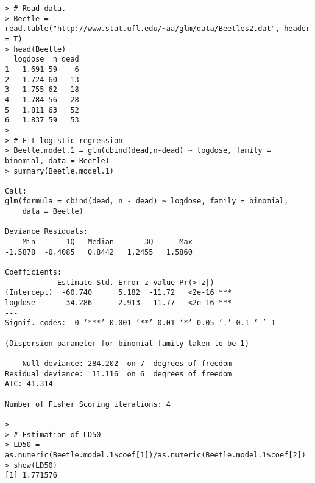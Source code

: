 \documentclass[a4paper]{article}
\begin{document}
\begin{lstlisting}
> # Read data.
> Beetle = read.table("http://www.stat.ufl.edu/~aa/glm/data/Beetles2.dat", header = T)
> head(Beetle)
  logdose  n dead
1   1.691 59    6
2   1.724 60   13
3   1.755 62   18
4   1.784 56   28
5   1.811 63   52
6   1.837 59   53
> 
> # Fit logistic regression
> Beetle.model.1 = glm(cbind(dead,n-dead) ~ logdose, family = binomial, data = Beetle)
> summary(Beetle.model.1)

Call:
glm(formula = cbind(dead, n - dead) ~ logdose, family = binomial, 
    data = Beetle)

Deviance Residuals: 
    Min       1Q   Median       3Q      Max  
-1.5878  -0.4085   0.8442   1.2455   1.5860  

Coefficients:
            Estimate Std. Error z value Pr(>|z|)    
(Intercept)  -60.740      5.182  -11.72   <2e-16 ***
logdose       34.286      2.913   11.77   <2e-16 ***
---
Signif. codes:  0 ‘***’ 0.001 ‘**’ 0.01 ‘*’ 0.05 ‘.’ 0.1 ‘ ’ 1

(Dispersion parameter for binomial family taken to be 1)

    Null deviance: 284.202  on 7  degrees of freedom
Residual deviance:  11.116  on 6  degrees of freedom
AIC: 41.314

Number of Fisher Scoring iterations: 4

> 
> # Estimation of LD50
> LD50 = -as.numeric(Beetle.model.1$coef[1])/as.numeric(Beetle.model.1$coef[2])
> show(LD50)
[1] 1.771576
\end{lstlisting}
\end{document}
